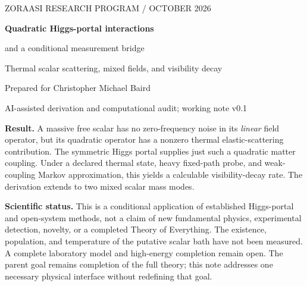 \documentclass[11pt]{article}
\begin{document}
\begin{center}
{\small\color{ink} ZORAASI RESEARCH PROGRAM \quad /  OCTOBER 2026}\par
\vspace{8pt}
{\LARGE\bfseries Quadratic Higgs-portal interactions\par and a conditional measurement bridge}\par
\vspace{8pt}
{\large Thermal scalar scattering, mixed fields, and visibility decay}\par
\vspace{5pt}
Prepared for Christopher Michael Baird\par
AI-assisted derivation and computational audit; working note v0.1
\end{center}

\textbf{Result.} A massive free scalar has no zero-frequency noise in its
\emph{linear} field operator, but its quadratic operator has a nonzero thermal
elastic-scattering contribution. The symmetric Higgs portal supplies just such
a quadratic matter coupling. Under a declared thermal state, heavy fixed-path
probe, and weak-coupling Markov approximation, this yields a calculable
visibility-decay rate. The derivation extends to two mixed scalar mass modes.

\textbf{Scientific status.} This is a conditional application of established
Higgs-portal and open-system methods, not a claim of new fundamental physics,
experimental detection, novelty, or a completed Theory of Everything.
The existence, population, and temperature of the putative scalar bath have
not been measured. A complete laboratory model and high-energy completion
remain open. The parent goal remains completion of the full theory; this
note addresses one necessary physical interface without redefining that goal.
\end{document}
